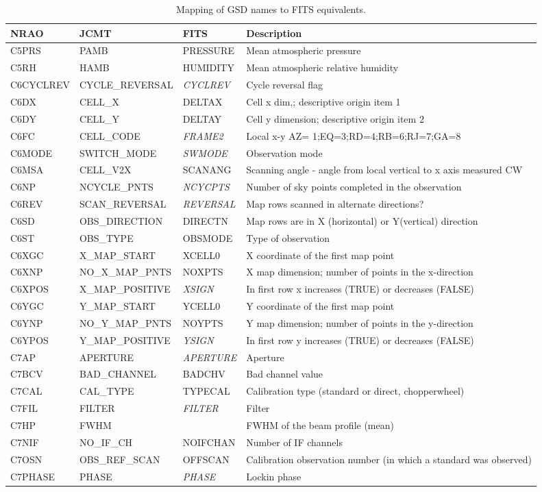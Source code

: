 \begin{sidewaystable*}
\caption{Mapping of GSD names to FITS equivalents.}
\begin{center}
\small
\begin{tabular}{llll}
\hline
NRAO & JCMT & FITS & Description\\ \hline

C5PRS & PAMB & PRESSURE & Mean atmospheric pressure\\
C5RH & HAMB & HUMIDITY & Mean atmospheric relative humidity\\
C6CYCLREV & CYCLE\_REVERSAL & \emph{CYCLREV} & Cycle reversal flag\\
C6DX & CELL\_X & DELTAX & Cell x dim,; descriptive origin item 1\\
C6DY & CELL\_Y & DELTAY & Cell y dimension; descriptive origin item 2\\
C6FC & CELL\_CODE & \emph{FRAME2} & Local x-y AZ= 1;EQ=3;RD=4;RB=6;RJ=7;GA=8\\
C6MODE & SWITCH\_MODE & \emph{SWMODE} & Observation mode\\
C6MSA & CELL\_V2X & SCANANG & Scanning angle - angle from local vertical to x axis measured CW\\
C6NP & NCYCLE\_PNTS & \emph{NCYCPTS} & Number of sky points completed in the observation\\
C6REV & SCAN\_REVERSAL & \emph{REVERSAL} & Map rows scanned in alternate directions?\\
C6SD & OBS\_DIRECTION & DIRECTN & Map rows are in X (horizontal) or Y(vertical) direction\\
C6ST & OBS\_TYPE & OBSMODE & Type of observation\\
C6XGC & X\_MAP\_START & XCELL0 & X coordinate of the first map point\\
C6XNP & NO\_X\_MAP\_PNTS & NOXPTS & X map dimension; number of points in the x-direction\\
C6XPOS & X\_MAP\_POSITIVE & \emph{XSIGN} & In first row x increases (TRUE) or decreases (FALSE)\\
C6YGC & Y\_MAP\_START & YCELL0 & Y coordinate of the first map point\\
C6YNP & NO\_Y\_MAP\_PNTS & NOYPTS & Y map dimension; number of points in the y-direction\\
C6YPOS & Y\_MAP\_POSITIVE & \emph{YSIGN} & In first row y increases (TRUE) or decreases (FALSE)\\
C7AP & APERTURE & \emph{APERTURE} & Aperture\\
C7BCV & BAD\_CHANNEL & BADCHV & Bad channel value\\
C7CAL & CAL\_TYPE & TYPECAL & Calibration type (standard or direct, chopperwheel)\\
C7FIL & FILTER & \emph{FILTER} & Filter\\
C7HP & FWHM &  & FWHM of the beam profile (mean)\\
C7NIF & NO\_IF\_CH & NOIFCHAN & Number of IF channels\\
C7OSN & OBS\_REF\_SCAN & OFFSCAN & Calibration observation number (in which a standard was observed)\\
C7PHASE & PHASE & \emph{PHASE} & Lockin phase\\


\end{tabular}
\end{center}
\end{sidewaystable*}
